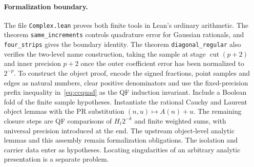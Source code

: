 \paragraph{Formalization boundary.}
The file \texttt{Complex.lean} proves both finite tools in Lean's ordinary arithmetic. The theorem \texttt{same\_increments} controls quadrature error for Gaussian rationals, and \texttt{four\_strips} gives the boundary identity. The theorem \texttt{diagonal\_regular} also verifies the two-level name construction, taking the sample at stage $\operatorname{cut}(p+2)$ and inner precision $p+2$ once the outer coefficient error has been normalized to $2^{-p}$. To construct the object proof, encode the signed fractions, point samples and edges as natural numbers, clear positive denominators and use the fixed-precision prefix inequality in~\eqref{eq:ccquad} as the QF induction invariant. Include a Boolean fold of the finite sample hypotheses. Instantiate the rational Cauchy and Laurent object lemmas with the PR substitution $(n,u)\mapsto A(n)+u$. The remaining closure steps are QF comparisons of $H_\ell 2^{-k}$ and finite weighted sums, with universal precision introduced at the end. The upstream object-level analytic lemmas and this assembly remain formalization obligations. The isolation and carrier data enter as hypotheses. Locating singularities of an arbitrary analytic presentation is a separate problem.
